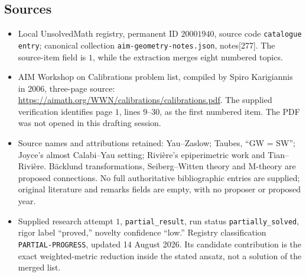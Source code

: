\documentclass[11pt]{article}
\begin{document}
\subsection{Sources}
\begin{itemize}
\item Local UnsolvedMath registry, permanent ID \(20001940\), source code \texttt{catalogue entry}; canonical collection \texttt{aim-geometry-notes.json}, notes[277]. The source-item field is \(1\), while the extraction merges eight numbered topics.
\item AIM Workshop on Calibrations problem list, compiled by Spiro Karigiannis in 2006, three-page source: \url{https://aimath.org/WWN/calibrations/calibrations.pdf}. The supplied verification identifies page \(1\), lines \(9\)--\(30\), as the first numbered item. The PDF was not opened in this drafting session.
\item Source names and attributions retained: Yau--Zaslow; Taubes, ``GW = SW''; Joyce's almost Calabi--Yau setting; Rivi\`ere's epiperimetric work and Tian--Rivi\`ere. B\"acklund transformations, Seiberg--Witten theory and M-theory are proposed connections. No full authoritative bibliographic entries are supplied; original literature and remarks fields are empty, with no proposer or proposed year.
\item Supplied research attempt \(1\), \texttt{partial\_result}, run status \texttt{partially\_solved}, rigor label ``proved,'' novelty confidence ``low.'' Registry classification \texttt{PARTIAL-PROGRESS}, updated 14 August 2026. Its candidate contribution is the exact weighted-metric reduction inside the stated ansatz, not a solution of the merged list.
\end{itemize}
\end{document}

